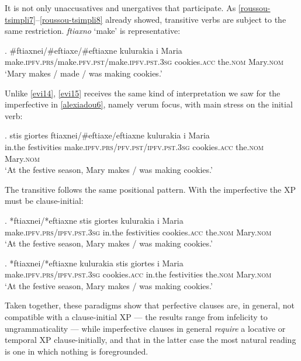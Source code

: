 \documentclass[11pt]{article}
\newcommand{\pfv}{\textsc{pfv}\xspace}
\newcommand{\ipfv}{\textsc{ipfv}\xspace}
\begin{document}
It is not only unaccusatives and unergatives that participate.  As \ref{roussou-tsimpli7}--\ref{roussou-tsimpli8} already showed, transitive verbs are subject to the same restriction.  \emph{ftiaxno} `make' is representative:

\exg. \#ftiaxnei/\#eftiaxe/\#eftiaxne kulurakia i Maria\\
make.\ipfv.\textsc{prs}/make.\pfv.\textsc{pst}/make.\ipfv.\textsc{pst}.3\textsc{sg} cookies.\textsc{acc} the.\textsc{nom} Mary.\textsc{nom}\\ \label{evi15}
`Mary makes / made / was making cookies.'

Unlike \ref{evi14}, \ref{evi15} receives the same kind of interpretation we saw for the imperfective in \ref{alexiadou6}, namely verum focus, with main stress on the initial verb:

\exg. stis giortes ftiaxnei/\#eftiaxe/eftiaxne kulurakia i Maria\\
in.the festivities make.\ipfv.\textsc{prs}/\pfv.\textsc{pst}/\ipfv.\textsc{pst}.3\textsc{sg} cookies.\textsc{acc} the.\textsc{nom} Mary.\textsc{nom}\\ \label{evi14}
`At the festive season, Mary makes / was making cookies.'

The transitive follows the same positional pattern.  With the imperfective the XP must be clause-initial:

\exg. *ftiaxnei/*eftiaxne stis giortes kulurakia i Maria\\
make.\ipfv.\textsc{prs}/\ipfv.\textsc{pst}.3\textsc{sg} in.the festivities cookies.\textsc{acc} the.\textsc{nom} Mary.\textsc{nom}\\ \label{evi141}
`At the festive season, Mary makes / was making cookies.'

\exg. *ftiaxnei/*eftiaxne kulurakia stis giortes i Maria\\
make.\ipfv.\textsc{prs}/\ipfv.\textsc{pst}.3\textsc{sg} cookies.\textsc{acc} in.the festivities the.\textsc{nom} Mary.\textsc{nom}\\ \label{evi142}
`At the festive season, Mary makes / was making cookies.'

Taken together, these paradigms show that perfective clauses are, in general, not compatible with a clause-initial XP --- the results range from infelicity to ungrammaticality --- while imperfective clauses in general \emph{require} a locative or temporal XP clause-initially, and that in the latter case the most natural reading is one in which nothing is foregrounded.
\end{document}
